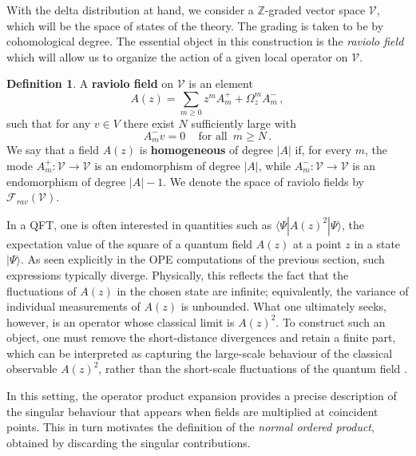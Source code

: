 \documentclass[11pt]{amsart}
\newcommand{\CV}{{\mathcal V}}
\numberwithin{equation}{section}
\numberwithin{figure}{section}
\numberwithin{table}{section}
\theoremstyle{thm}
\numberwithin{equation}{subsection}
\theoremstyle{definition}
\newtheorem{dfn}[theorem]{Definition}
\theoremstyle{rem}
\begin{document}
With the delta distribution at hand, we consider a $\mathbb{Z}$-graded vector space $\mathcal{V}$, which will be the space of states of the theory. The grading is taken to be by cohomological degree. The essential object in this construction is the \textit{raviolo field} which will allow us to organize the action of a given local operator on $\CV$. 

\begin{dfn}
    A \textbf{raviolo field} on $\mathcal{V}$ is an element
    \begin{equation}
        A(z) = \sum_{m \geq  0} z^{m}A^+_m + \Omega_z^m A^-_m \,,
    \end{equation}
    such that for any $v\in V$ there exist $N$ sufficiently large with 
    \begin{equation}
        A^-_m v= 0\,\quad \text{for all }\,m\geq N\,.
    \end{equation}
We say that a field $A(z)$ is \textbf{homogeneous} of degree $|A|$ if, for every $m$, 
the mode 
$A^+_m : \CV \to \CV$ 
is an endomorphism of degree $|A|$, 
while $A^-_m : \CV \to \CV$
is an endomorphism of degree $|A|-1$. We denote the space of raviolo fields by $\mathcal{F}_{rav}(\CV)$. 
 
    
\end{dfn}

In a QFT, one is often interested in quantities 
such as $\langle \Psi | A(z)^2 | \Psi \rangle$, the expectation value of the square of a quantum field $A(z)$ at a point $z$ in a state $|\Psi\rangle$. 
As seen explicitly in the OPE computations of the previous section, such expressions typically diverge. 
Physically, this reflects the fact that the fluctuations of $A(z)$ in the chosen state are infinite; 
equivalently, the variance of individual measurements of $A(z)$ is unbounded. 
What one ultimately seeks, however, is an operator whose classical limit is $A(z)^2$. 
To construct such an object, one must remove the short-distance divergences and retain a finite part, 
which can be interpreted as capturing the large-scale behaviour of the classical observable $A(z)^2$, 
rather than the short-scale fluctuations of the quantum field \cite{Hollands:2023txn}.  

In this setting, the operator product expansion provides a precise description of the singular behaviour 
that appears when fields are multiplied at coincident points. This in turn motivates the definition of the 
\emph{normal ordered product}, obtained by discarding the singular contributions. 
\end{document}
